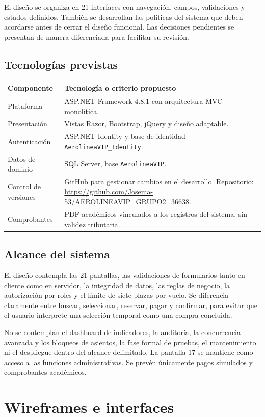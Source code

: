 \documentclass[11pt,a4paper]{article}
\newcommand{\Repositorio}{\url{https://github.com/Josema-53/AEROLINEAVIP_GRUPO2_36638}}
\begin{document}
El diseño se organiza en 21 interfaces con navegación, campos, validaciones y estados definidos. También se desarrollan las políticas del sistema que deben acordarse antes de cerrar el diseño funcional. Las decisiones pendientes se presentan de manera diferenciada para facilitar su revisión.

\subsection{Tecnologías previstas}
\begin{tabularx}{\textwidth}{@{}p{3.3cm}X@{}}
\toprule
\textbf{Componente} & \textbf{Tecnología o criterio propuesto}\\\midrule
Plataforma & ASP.NET Framework 4.8.1 con arquitectura MVC monolítica.\\
Presentación & Vistas Razor, Bootstrap, jQuery y diseño adaptable.\\
Autenticación & ASP.NET Identity y base de identidad \texttt{AerolineaVIP\_Identity}.\\
Datos de dominio & SQL Server, base \texttt{AerolineaVIP}.\\
Control de versiones & GitHub para gestionar cambios en el desarrollo. Repositorio: \Repositorio.\\
Comprobantes & PDF académicos vinculados a los registros del sistema, sin validez tributaria.\\
\bottomrule
\end{tabularx}

\subsection{Alcance del sistema}
El diseño contempla las 21 pantallas, las validaciones de formularios tanto en cliente como en servidor, la integridad de datos, las reglas de negocio, la autorización por roles y el límite de siete plazas por vuelo. Se diferencia claramente entre buscar, seleccionar, reservar, pagar y confirmar, para evitar que el usuario interprete una selección temporal como una compra concluida.

No se contemplan el dashboard de indicadores, la auditoría, la concurrencia avanzada y los bloqueos de asientos, la fase formal de pruebas, el mantenimiento ni el despliegue dentro del alcance delimitado. La pantalla 17 se mantiene como acceso a las funciones administrativas. Se prevén únicamente pagos simulados y comprobantes académicos.


\section{Wireframes e interfaces}
\end{document}
